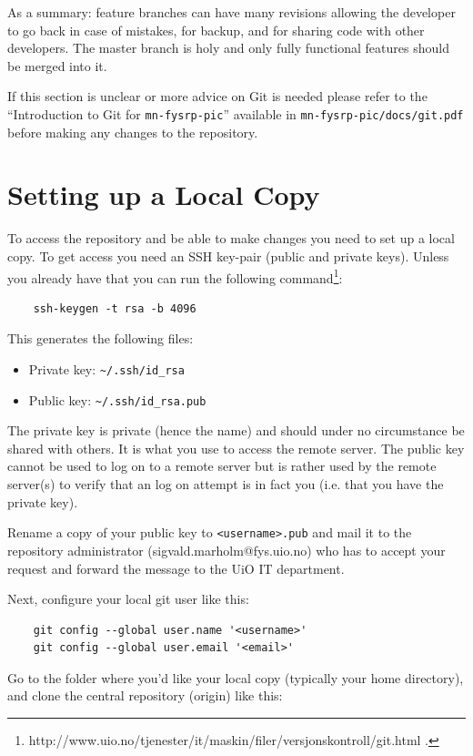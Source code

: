\documentclass[10pt,a4paper]{article}
\newcommand{\mnfysrppic}{\texttt{mn-fysrp-pic}}
\begin{document}
As a summary: feature branches can have many revisions allowing the developer to go back in case of mistakes, for backup, and for sharing code with other developers. The master branch is holy and only fully functional features should be merged into it.

If this section is unclear or more advice on Git is needed please refer to the ``Introduction to Git for \mnfysrppic{}'' available in \texttt{mn-fysrp-pic/docs/git.pdf} before making any changes to the repository.

\section{Setting up a Local Copy}
To access the repository and be able to make changes you need to set up a local copy. To get access you need an SSH key-pair (public and private keys). Unless you already have that you can run the following command\footnote{http://www.uio.no/tjenester/it/maskin/filer/versjonskontroll/git.html .}:

\begin{lstlisting}
	ssh-keygen -t rsa -b 4096
\end{lstlisting}

This generates the following files:
\begin{itemize}
	\item Private key: \lstinline$~/.ssh/id_rsa$
	\item Public key: \lstinline$~/.ssh/id_rsa.pub$
\end{itemize}
The private key is private (hence the name) and should under no circumstance be shared with others. It is what you use to access the remote server. The public key cannot be used to log on to a remote server but is rather used by the remote server(s) to verify that an log on attempt is in fact you (i.e. that you have the private key).

Rename a copy of your public key to \lstinline$<username>.pub$ and mail it to the repository administrator (sigvald.marholm@fys.uio.no) who has to accept your request and forward the message to the UiO IT department.

Next, configure your local git user like this:

\begin{lstlisting}
	git config --global user.name '<username>'
	git config --global user.email '<email>'
\end{lstlisting}
Go to the folder where you'd like your local copy (typically your home directory), and clone the central repository (origin) like this:
\end{document}
